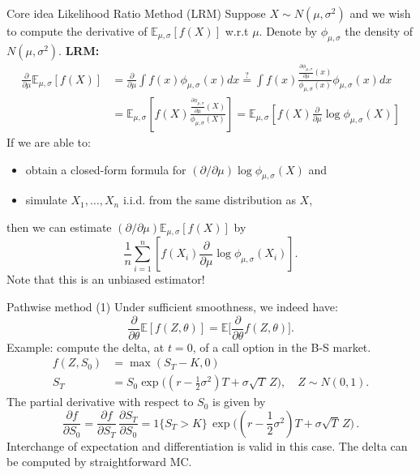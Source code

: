 \documentclass[pdf, handout]{beamer}
\begin{document}
\begin{frame}{Core idea Likelihood Ratio Method (LRM)}
Suppose $X \sim N(\mu,\sigma^2)$ and we wish to compute the derivative of $\mathbb{E}_{\mu,\sigma}[f(X)]$ w.r.t $\mu$. Denote by $\phi_{\mu,\sigma}$ the density of $N(\mu,\sigma^2)$.
\vskip4mm
\textbf{LRM:}
\begin{align*}
\frac{\partial}{\partial\mu} \mathbb{E}_{\mu,\sigma}[f(X)] &= \frac{\partial}{\partial\mu} \int f(x) \phi_{\mu,\sigma}(x) dx \stackrel{?}{=} \int f(x) \frac{\frac{\partial  \phi_{\mu,\sigma}}{\partial\mu}(x)}{\phi_{\mu,\sigma}(x)} \phi_{\mu,\sigma}(x) dx
\\
&= \mathbb{E}_{\mu,\sigma}\left[f(X) \frac{\frac{\partial  \phi_{\mu,\sigma}}{\partial\mu}(X)}{\phi_{\mu,\sigma}(X)}  \right]
= 
\mathbb{E}_{\mu,\sigma}\left[f(X) \frac{\partial}{\partial\mu} \log  \phi_{\mu,\sigma}(X)  \right]
\end{align*}
If we are able to:
\begin{itemize}
\item obtain a closed-form formula for $(\partial/\partial\mu) \log  \phi_{\mu,\sigma}(X)$ and
\item simulate $X_1,\dots,X_n$ i.i.d. from the same distribution as $X$,
\end{itemize}
then we can estimate $(\partial/\partial\mu) \mathbb{E}_{\mu,\sigma}[f(X)]$ by
\[
\frac{1}{n}\sum_{i=1}^n
\left[
 f(X_i) \frac{\partial}{\partial\mu} \log  \phi_{\mu,\sigma}(X_i)\right].
\]
Note that this is an unbiased estimator!
\end{frame}



\begin{frame}{Pathwise method (1)}
Under sufficient smoothness, we indeed have:
$$
\frac{\partial}{\partial \theta} \mathbb{E} [f(Z,\theta)] = \mathbb{E} \Big[ \frac{\partial}{\partial\theta}f(Z,\theta)\Big].
$$
Example: compute the delta, at $t=0$, of a call option in the B-S market.
\begin{align*}
f(Z,S_0) & = \max(S_T-K,0) \\
S_T & = S_0\exp\!\big((r-\tfrac{1}{2}\sigma^2)T + \sigma \sqrt{T} \,Z\big),
\quad Z \sim N(0,1).
\end{align*}
\pause
The partial      derivative with respect to $S_0$ is given by
$$
\frac{\partial f}{\partial S_0} = \frac{\partial f}{ \partial S_T}\, \frac{\partial S_T}{\partial S_0} =
1\{S_T>K\}\,\exp\!\big((r-\frac{1}{2}\sigma^2)T + \sigma \sqrt{T} \,Z\big) \,.
$$
\pause
Interchange of expectation and differentiation is valid in this case. The delta can be
computed by straightforward MC.
\end{frame}
\end{document}
